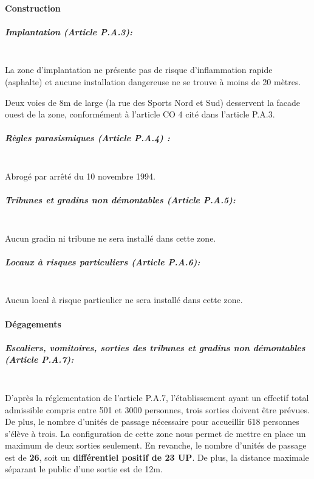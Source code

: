 \documentclass[hidelinks, paper=a4, fontsize=13pt]{report}
\begin{document}
\paragraph{Construction}

\subparagraph*{Implantation (Article P.A.3):}\mbox{}\\
La zone d’implantation ne présente pas de risque d’inflammation rapide (asphalte) et aucune installation dangereuse ne se trouve à moins de 20 mètres.

Deux voies de 8m de large (la rue des Sports Nord et Sud) desservent la facade ouest de la zone, conformément à l'article CO 4 cité dans l'article P.A.3.

\subparagraph*{Règles parasismiques (Article P.A.4) :}\mbox{}\\
Abrogé par arrêté du 10 novembre 1994.

\subparagraph*{Tribunes et gradins non démontables (Article P.A.5):}\mbox{}\\
Aucun gradin ni tribune ne sera installé dans cette zone.

\subparagraph*{Locaux à risques particuliers (Article P.A.6):}\mbox{}\\
Aucun local à risque particulier ne sera installé dans cette zone.

\paragraph{Dégagements}

\subparagraph*{Escaliers, vomitoires, sorties des tribunes et gradins non démontables (Article P.A.7):}\mbox{}\\
D’après la réglementation de l’article P.A.7, l’établissement ayant un effectif total admissible compris entre 501 et 3000 personnes, trois sorties doivent être prévues. De plus, le nombre d'unités de passage nécessaire pour accueillir 618 personnes s'élève à trois.
La configuration de cette zone nous permet de mettre en place un maximum de deux sorties seulement. En revanche, le nombre d'unités de passage est de \textbf{26}, soit un \textbf{différentiel positif de 23 UP}. De plus, la distance maximale séparant le public d'une sortie est de 12m.
\end{document}
